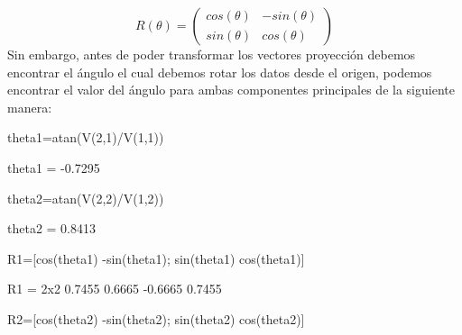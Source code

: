 \documentclass{article}
\begin{document}
\[
R(\theta)=
\begin{pmatrix}
cos(\theta) & -sin(\theta)\\
sin(\theta) & cos(\theta) 
\end{pmatrix}\]
Sin embargo, antes de poder transformar los vectores proyección debemos encontrar el ángulo el cual debemos rotar los datos desde el origen, podemos encontrar el valor del ángulo para ambas componentes principales de la siguiente manera:
\begin{matlabcode}
theta1=atan(V(2,1)/V(1,1))
\end{matlabcode}
\begin{matlaboutput}
theta1 = -0.7295
\end{matlaboutput}
\begin{matlabcode}
theta2=atan(V(2,2)/V(1,2))
\end{matlabcode}
\begin{matlaboutput}
theta2 = 0.8413
\end{matlaboutput}
\begin{matlabcode}
R1=[cos(theta1)  -sin(theta1);
    sin(theta1)  cos(theta1)]
\end{matlabcode}
\begin{matlaboutput}
R1 = 2x2    
    0.7455    0.6665
   -0.6665    0.7455
\end{matlaboutput}
\begin{matlabcode}
R2=[cos(theta2)  -sin(theta2);
    sin(theta2)  cos(theta2)]
\end{matlabcode}
\end{document}
